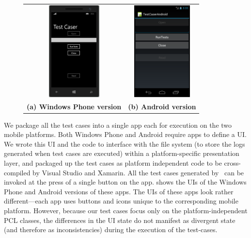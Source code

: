 \begin{figure}[t!]
\centering
\begin{tabular}{cc}
\includegraphics[keepaspectratio=true,height=5cm]{figures/windows.png} &
\includegraphics[keepaspectratio=true,height=5cm]{figures/android.png}\\
{\bf \footnotesize (a) Windows Phone version} &
{\bf \footnotesize (b) Android version}
\end{tabular}
\end{figure}

We package all the test cases into a single app each for execution on the two
mobile platforms. Both Windows Phone and Android require apps to define a UI.
We wrote this UI and the code to interface with the file system (to store the
logs generated when test cases are executed) within a  platform-specific
presentation layer, and packaged up the test cases as platform independent code
to be cross-compiled by Visual Studio and Xamarin. All the test cases generated
by \tool\ can be invoked at the press of a single button on the app.
 shows the UIs of the Windows Phone and
Android versions of these apps. The UIs of these apps look rather
different---each app uses buttons and icons unique to the corresponding mobile
platform. However, because our test cases focus only on the
platform-independent PCL classes, the differences in the UI state do not
manifest as divergent state (and therefore as inconsistencies) during the
execution of the test-cases.

